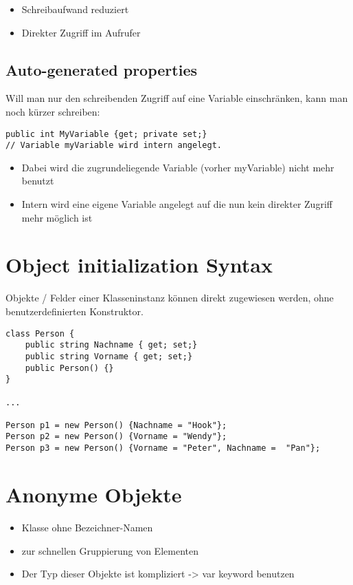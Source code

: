 \begin{itemize}
\item Schreibaufwand reduziert
\item Direkter Zugriff im Aufrufer
\end{itemize}

\subsection{Auto-generated properties}
Will man nur den schreibenden Zugriff auf eine Variable einschränken, kann man noch kürzer schreiben:\\
\begin{lstlisting}[language={[Sharp]C}]
public int MyVariable {get; private set;}
// Variable myVariable wird intern angelegt.
\end{lstlisting}
\begin{itemize}
\item Dabei wird die zugrundeliegende Variable (vorher myVariable) nicht mehr benutzt
\item Intern wird eine eigene Variable angelegt auf die nun kein direkter Zugriff mehr möglich ist
\end{itemize}

\section{Object initialization Syntax}

Objekte / Felder einer Klasseninstanz können direkt zugewiesen werden, ohne benutzerdefinierten Konstruktor.
\begin{lstlisting}[language={[Sharp]C}]
class Person { 
	public string Nachname { get; set;} 
	public string Vorname { get; set;} 
	public Person() {} 
}

...

Person p1 = new Person() {Nachname = "Hook"}; 
Person p2 = new Person() {Vorname = "Wendy"}; 
Person p3 = new Person() {Vorname = "Peter", Nachname =  "Pan"};
\end{lstlisting}

\section{Anonyme Objekte}

\begin{itemize}
\item Klasse ohne Bezeichner-Namen
\item zur schnellen Gruppierung von Elementen 
\item Der Typ dieser Objekte ist kompliziert -{\textgreater} var keyword benutzen
\end{itemize}